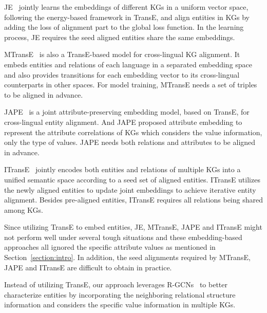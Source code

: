 	JE~\cite{hao2016joint} jointly learns the embeddings of different KGs in a uniform vector space, following the energy-based framework in TransE, and align entities in KGs by adding the loss of alignment part to the global loss function. In the learning process, JE requires the seed aligned entities share the same embeddings.
	
	MTransE~\cite{chen2016multilingual} is also a TransE-based model for cross-lingual KG alignment. It embeds entities and relations of each language in a separated embedding space and also provides transitions for each embedding vector to its cross-lingual counterparts in other spaces. For model training, MTransE needs a set of triples to be aligned in advance.
	
	JAPE~\cite{sun2017cross} is a joint attribute-preserving embedding model, based on TransE, for cross-lingual entity alignment. And JAPE proposed attribute embedding to represent the attribute correlations of KGs which considers the value information, only the type of values. JAPE needs both relations and attributes to be aligned in advance.
	
	ITransE~\cite{zhu2017iterative} jointly encodes both entities and relations of multiple KGs into a unified semantic space according to a seed set of aligned entities. ITransE utilizes the newly aligned entities to update joint embeddings to achieve iterative entity alignment. Besides pre-aligned entities, ITransE requires all relations being shared among KGs.
	
	Since utilizing TransE to embed entities, JE, MTransE, JAPE and ITransE might not perform well under several tough situations and these embedding-based approaches all ignored the specific attribute values as mentioned in Section~\ref{section:intro}. In addition, the seed alignments required by MTransE, JAPE and ITransE are difficult to obtain in practice.
	
	Instead of utilizing TransE, our approach leverages R-GCNs~\cite{Schlichtkrull2017Modeling} to better characterize entities by incorporating the neighboring relational structure information and considers the specific value information in multiple KGs.
